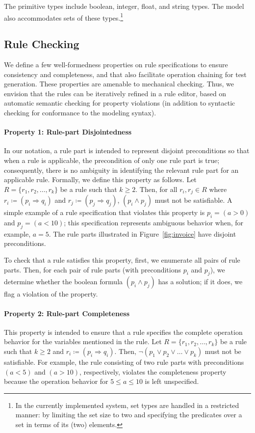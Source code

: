 The primitive types include boolean, integer, float, and string types. The model
also accommodates sets of these types.\footnote{\small In the currently
  implemented system, set types are handled in a restricted manner: by limiting
  the set size to two and specifying the predicates over a set in terms of its
  (two) elements.}

\subsection{Rule Checking}
\label{sec:checking}
 
We define a few well-formedness properties on rule specifications to ensure
consistency and completeness, and that also facilitate operation chaining for
test generation. These properties are amenable to mechanical checking. Thus, we
envision that the rules can be iteratively refined in a rule editor, based on
automatic semantic checking for property violations (in addition to syntactic
checking for conformance to the modeling syntax).

\paragraph*{Property 1: Rule-part Disjointedness}
In our notation, a rule part is intended to represent disjoint preconditions so
that when a rule is applicable, the precondition of only one rule part is true;
consequently, there is no ambiguity in identifying the relevant rule part for an
applicable rule. Formally, we define this property as follows. Let $R= \{r_1,
r_2, \ldots, r_k\}$ be a rule such that $k \geq 2$. Then, for all $r_i, r_j \in
R$ where $ r_i \coloneqq (p_i \Longrightarrow q_i)$ and $r_j \coloneqq (p_j
\Longrightarrow q_j)$, $(p_i \wedge p_j)$ must not be satisfiable. A simple
example of a rule specification that violates this property is $p_i = (a > 0)$
and $p_j = (a < 10)$; this specification represents ambiguous behavior when, for
example, $a = 5$.  The rule parts illustrated in Figure~\ref{fig:invoice} have
disjoint preconditions.

To check that a rule satisfies this property, first, we enumerate all pairs of
rule parts. Then, for each pair of rule parts (with preconditions $p_i$ and
$p_j$), we determine whether the boolean formula $(p_i \wedge p_j)$ has a
solution; if it does, we flag a violation of the property.

\paragraph*{Property 2: Rule-part Completeness}
This property is intended to ensure that a rule specifies the complete operation
behavior for the variables mentioned in the rule. Let $R= \{r_1, r_2, \ldots,
r_k\}$ be a rule such that $k \geq 2$ and $r_i \coloneqq (p_i \Longrightarrow
q_i)$. Then, $\neg(p_1 \vee p_2 \vee \ldots \vee p_k)$ must not be
satisfiable. For example, the rule consisting of two rule parts with
preconditions $(a < 5)$ and $(a > 10)$, respectively, violates the completeness
property because the operation behavior for $5 \leq a \leq 10$ is left
unspecified.

